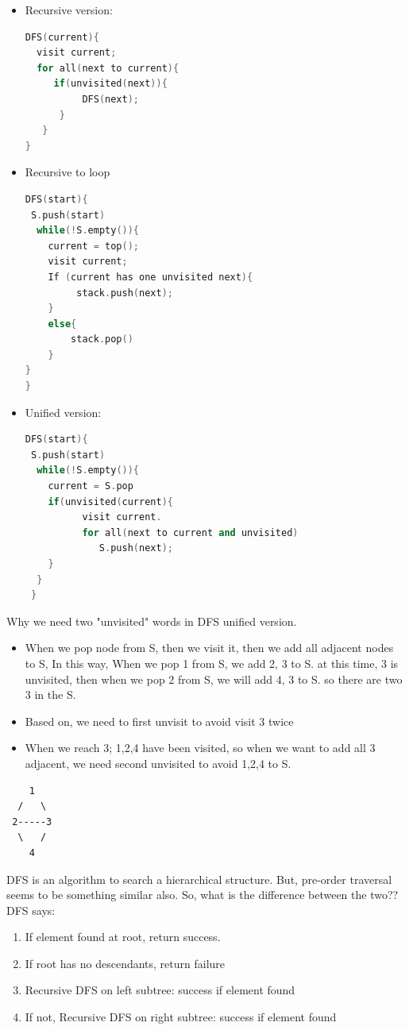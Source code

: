 \documentclass[a4paper,11pt,twoside]{book}
\begin{document}
\begin{itemize}
	
	\item Recursive version:
\begin{lstlisting}[frame=single, language=c++]
DFS(current){
  visit current;
  for all(next to current){
     if(unvisited(next)){
          DFS(next);
      }
   }
}
\end{lstlisting} 

\item Recursive to loop
\begin{lstlisting}[frame=single, language=c++]
DFS(start){
 S.push(start)  
  while(!S.empty()){
    current = top();
    visit current;
    If (current has one unvisited next){ 
         stack.push(next);
    }   
    else{
        stack.pop()
    }
}
}
\end{lstlisting} 

\item Unified version:
\begin{lstlisting}[frame=single, language=c++]
DFS(start){
 S.push(start)  
  while(!S.empty()){
    current = S.pop
    if(unvisited(current){
          visit current.
          for all(next to current and unvisited)
             S.push(next);
    }
  }
 }
\end{lstlisting} 
\end{itemize}

	\par  Why we need two "unvisited" words in DFS unified version.  
\begin{itemize}
\item When we pop node from S, then we visit it, then we add all adjacent nodes to S, In this way, When we pop 1 from S, we add 2, 3 to S. at this time, 3 is unvisited, then when we pop 2 from S, we will add 4, 3 to S. so there are two 3 in the S. 
\item Based on, we need to first unvisit to avoid visit 3 twice

\item When we reach 3; 1,2,4 have been visited, so when we want to add all 3 adjacent, we need second unvisited to avoid 1,2,4 to S.  
\end{itemize}
\begin{verbatim}
    1
  /   \
 2-----3
  \   /
    4      
\end{verbatim}

\par DFS is an algorithm to search a hierarchical structure. But, pre-order traversal seems to be something similar also. So, what is the difference between the two?? DFS says:
\begin{enumerate}
\item If element found at root, return success.
\item If root has no descendants, return failure
\item Recursive DFS on left subtree: success if element found
\item If not, Recursive DFS on right subtree: success if element found
\end{enumerate}
\end{document}
